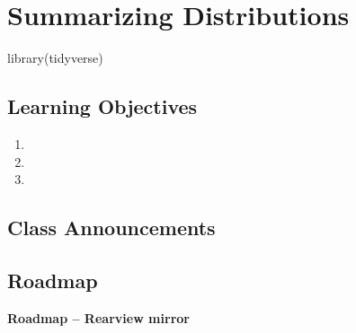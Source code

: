 \documentclass[
]{book}
\newenvironment{Shaded}{\begin{snugshade}}{\end{snugshade}}
\newcommand{\FunctionTok}[1]{\textcolor[rgb]{0.00,0.00,0.00}{#1}}
\newcommand{\NormalTok}[1]{#1}
\providecommand{\tightlist}{%
  \setlength{\itemsep}{0pt}\setlength{\parskip}{0pt}}
\theoremstyle{definition}
\theoremstyle{definition}
\theoremstyle{definition}
\theoremstyle{definition}
\theoremstyle{remark}
\begin{document}
\hypertarget{summarizing-distributions}{%
\chapter{Summarizing Distributions}\label{summarizing-distributions}}

\begin{Shaded}
\begin{Highlighting}[]
\FunctionTok{library}\NormalTok{(tidyverse)}
\end{Highlighting}
\end{Shaded}

\hypertarget{learning-objectives-2}{%
\section{Learning Objectives}\label{learning-objectives-2}}

\begin{enumerate}
\def\labelenumi{\arabic{enumi}.}
\tightlist
\item
\item
\item
\end{enumerate}

\hypertarget{class-announcements-1}{%
\section{Class Announcements}\label{class-announcements-1}}

\hypertarget{roadmap}{%
\section{Roadmap}\label{roadmap}}

\textbf{Roadmap -- Rearview mirror}
\end{document}
